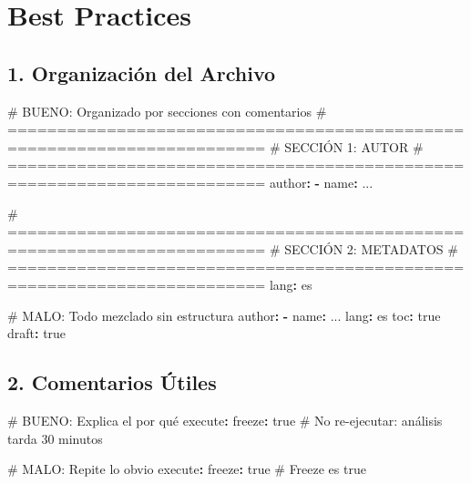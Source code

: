 \documentclass[
  doc,
  floatsintext,
  longtable,
  a4paper,
  nolmodern,
  notxfonts,
  notimes,
  12pt,
  colorlinks=true,linkcolor=blue,citecolor=blue,urlcolor=blue]{apa7}
\newenvironment{Shaded}{\begin{snugshade}}{\end{snugshade}}
\newcommand{\AttributeTok}[1]{\textcolor[rgb]{0.40,0.45,0.13}{#1}}
\newcommand{\CharTok}[1]{\textcolor[rgb]{0.13,0.47,0.30}{#1}}
\newcommand{\CommentTok}[1]{\textcolor[rgb]{0.37,0.37,0.37}{#1}}
\newcommand{\FunctionTok}[1]{\textcolor[rgb]{0.28,0.35,0.67}{#1}}
\newcommand{\KeywordTok}[1]{\textcolor[rgb]{0.00,0.23,0.31}{\textbf{#1}}}
\begin{document}
\section{Best Practices}\label{best-practices}

\subsection{1. Organización del
Archivo}\label{organizaciuxf3n-del-archivo}

\begin{Shaded}
\begin{Highlighting}[]
\CommentTok{\# BUENO: Organizado por secciones con comentarios}
\CommentTok{\# ========================================================================}
\CommentTok{\# SECCIÓN 1: AUTOR}
\CommentTok{\# ========================================================================}
\FunctionTok{author}\KeywordTok{:}
\AttributeTok{  }\KeywordTok{{-}}\AttributeTok{ }\FunctionTok{name}\KeywordTok{:}\AttributeTok{ ...}

\CommentTok{\# ========================================================================}
\CommentTok{\# SECCIÓN 2: METADATOS}
\CommentTok{\# ========================================================================}
\FunctionTok{lang}\KeywordTok{:}\AttributeTok{ es}
\end{Highlighting}
\end{Shaded}

\begin{Shaded}
\begin{Highlighting}[]
\CommentTok{\#  MALO: Todo mezclado sin estructura}
\FunctionTok{author}\KeywordTok{:}
\AttributeTok{  }\KeywordTok{{-}}\AttributeTok{ }\FunctionTok{name}\KeywordTok{:}\AttributeTok{ ...}
\FunctionTok{lang}\KeywordTok{:}\AttributeTok{ es}
\FunctionTok{toc}\KeywordTok{:}\AttributeTok{ }\CharTok{true}
\FunctionTok{draft}\KeywordTok{:}\AttributeTok{ }\CharTok{true}
\end{Highlighting}
\end{Shaded}

\subsection{2. Comentarios Útiles}\label{comentarios-uxfatiles}

\begin{Shaded}
\begin{Highlighting}[]
\CommentTok{\# BUENO: Explica el por qué}
\FunctionTok{execute}\KeywordTok{:}
\AttributeTok{  }\FunctionTok{freeze}\KeywordTok{:}\AttributeTok{ }\CharTok{true}\CommentTok{    \# No re{-}ejecutar: análisis tarda 30 minutos}

\CommentTok{\#  MALO: Repite lo obvio}
\FunctionTok{execute}\KeywordTok{:}
\AttributeTok{  }\FunctionTok{freeze}\KeywordTok{:}\AttributeTok{ }\CharTok{true}\CommentTok{    \# Freeze es true}
\end{Highlighting}
\end{Shaded}
\end{document}

